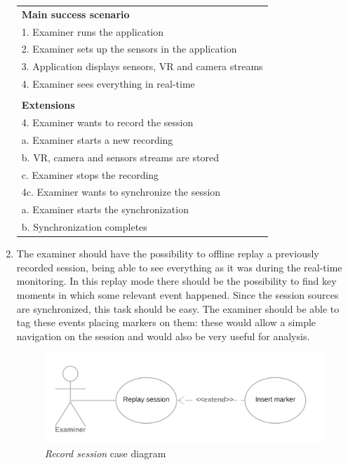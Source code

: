 \documentclass[binding=0.6cm,LaM]{sapthesis}
\begin{document}
\begin{enumerate}
\begin{center}
\vspace{.5cm}

\renewcommand{\arraystretch}{1}
\begin{tabular}{ l }
\textbf{Main success scenario} \\
1. Examiner runs the application\\
2. Examiner sets up the sensors in the application \\
3. Application displays sensors, VR and camera streams \\
4. Examiner sees everything in real-time \\

\vspace{0.1cm}\\

\textbf{Extensions} \\
4. Examiner wants to record the session\\
\quad a. Examiner starts a new recording \\
\quad b. VR, camera and sensors streams are stored \\
\quad c. Examiner stops the recording \\

4c. Examiner wants to synchronize the session\\
\quad a. Examiner starts the synchronization \\
\quad b. Synchronization completes \\

\end{tabular}

\end{center}

\item The examiner should have the possibility to offline replay a previously recorded session, being able to see everything as it was during the real-time monitoring. In this replay mode there should be the possibility to find key moments in which some relevant event happened. Since the session sources are synchronized, this task should be easy. The examiner should be able to tag these events placing markers on them: these would allow a simple navigation on the session and would also be very useful for analysis.

\begin{figure}[h]
\centering
\includegraphics[scale=.257]{images/use_case_2}
\caption{\textit{Record session} case diagram}
\end{figure}


\end{enumerate}
\end{document}
